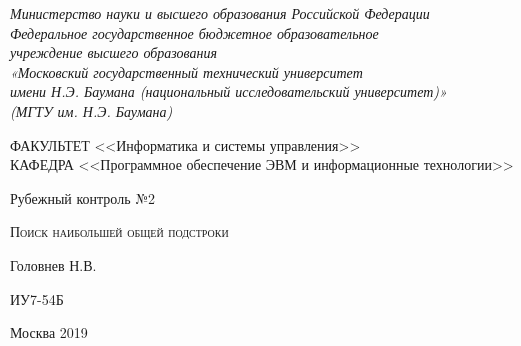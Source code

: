 \documentclass[a4paper,12pt]{article}
\begin{document}

\begin{titlepage}
\newpage

\begin{center}

\textit{Министерство науки и высшего образования Российской Федерации \\ 
Федеральное государственное бюджетное образовательное \\
учреждение высшего образования \\
«Московский государственный технический университет \\
имени Н.Э. Баумана (национальный исследовательский университет)» \\
(МГТУ им. Н.Э. Баумана) \\}
\hrulefill
\end{center}

\vspace{2em}

\begin{flushleft}
ФАКУЛЬТЕТ <<Информатика и системы управления>> \\
\vspace{0.5em}
КАФЕДРА <<Программное обеспечение ЭВМ и информационные технологии>>
\end{flushleft}


\vspace{8em}

\begin{center}
\LARGE Рубежный контроль №2 \\
\end{center}

\vspace{1.5em}

\begin{center}
\textsc{Поиск наибольшей общей подстроки}
\end{center}

\vspace{6em}

\begin{center}
Головнев Н.В.

\vspace{4em}

ИУ7-54Б
\end{center}

\vspace{\fill}

\begin{center}
Москва 2019
\end{center}

\end{titlepage}
\end{document}
